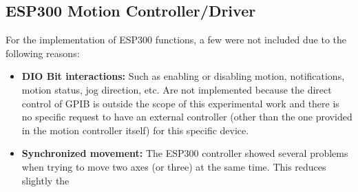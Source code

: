 \subsection{ESP300 Motion Controller/Driver}

For the implementation of ESP300 functions, a few were not included due to the following reasons:

\begin{itemize}
\item \textbf{DIO Bit interactions:} Such as enabling or disabling motion, notifications, motion status, jog direction, etc. Are not implemented because the direct control of GPIB is outside the scope of this experimental work and there is no specific request to have an external controller (other than the one provided in the motion controller itself) for this specific device.
\item \textbf{Synchronized movement:} The ESP300 controller showed several problems when trying to move two axes (or three) at the same time. This reduces slightly the 
\end{itemize}